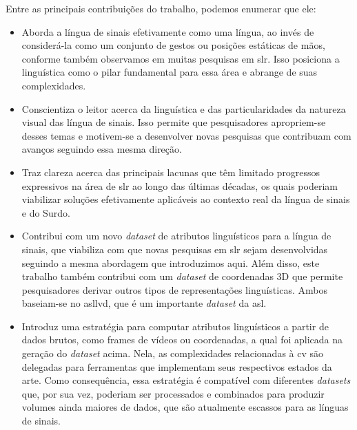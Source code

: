 
Entre as principais contribuições do trabalho, podemos enumerar que ele:

\begin{itemize}
    \item Aborda a língua de sinais efetivamente como uma língua, ao invés de considerá-la como um conjunto de gestos ou posições estáticas de mãos, conforme também observamos em muitas pesquisas em \acrshort{slr}.
          Isso posiciona a linguística como o pilar fundamental para essa área e abrange de suas complexidades.

    \item Conscientiza o leitor acerca da linguística e das particularidades da natureza visual das língua de sinais.
          Isso permite que pesquisadores apropriem-se desses temas e motivem-se a desenvolver novas pesquisas que contribuam com avanços seguindo essa mesma direção.

    \item Traz clareza acerca das principais lacunas que têm limitado progressos expressivos na área de \acrshort{slr} ao longo das últimas décadas, os quais poderiam viabilizar soluções efetivamente aplicáveis ao contexto real da língua de sinais e do Surdo. %

    \item Contribui com um novo \textit{dataset} de atributos linguísticos para a língua de sinais, que viabiliza com que novas pesquisas em \acrshort{slr} sejam desenvolvidas seguindo a mesma abordagem que introduzimos aqui.
          Além disso, este trabalho também contribui com um \textit{dataset} de coordenadas 3D que permite pesquisadores derivar outros tipos de representações linguísticas.
          Ambos baseiam-se no \acrshort{asllvd}, que é um importante \textit{dataset} da \acrshort{asl}.

    \item Introduz uma estratégia para computar atributos linguísticos a partir de dados brutos, como frames de vídeos ou coordenadas, a qual foi aplicada na geração do \textit{dataset} acima.
          Nela, as complexidades relacionadas à \acrlong{cv} são delegadas para ferramentas que implementam seus respectivos estados da arte.
          Como consequência, essa estratégia é compatível com diferentes \textit{datasets} que, por sua vez, poderiam ser processados e combinados para produzir volumes ainda maiores de dados, que são atualmente escassos para as línguas de sinais.

\end{itemize}

